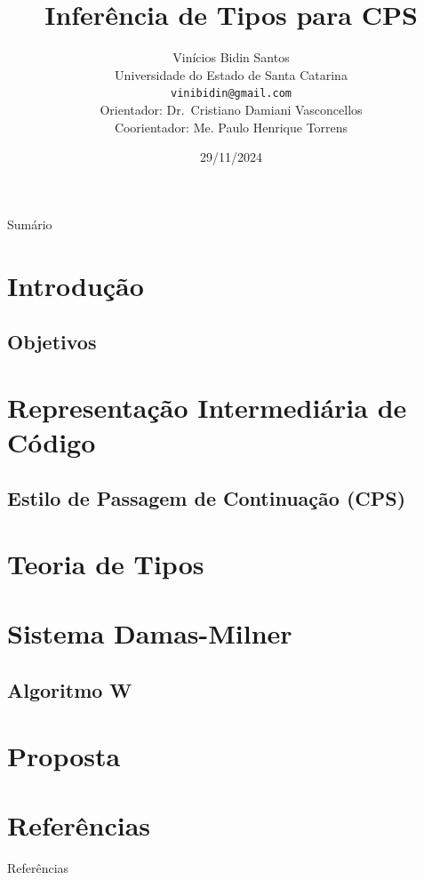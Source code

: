 \documentclass[xcolor=table]{beamer}
\title{Inferência de Tipos para CPS}
\author[Vinícios Bidin]{
    Vinícios Bidin Santos\\\smallskip
    {\scriptsize Universidade do Estado de Santa Catarina \\\smallskip
    \texttt{vinibidin@gmail.com}\\\medskip
    {Orientador: Dr.~Cristiano Damiani Vasconcellos}\\
    {Coorientador: Me. Paulo Henrique Torrens}\\
    }
}
\date{29/11/2024}
\begin{document}
\begin{frame}
    \titlepage%
\end{frame}

\begin{frame}[allowframebreaks]{Sumário}
    \tableofcontents
\end{frame}

\section[]{Introdução}

\subsection[]{Objetivos}


\section[]{Representação Intermediária de Código}

\subsection{Estilo de Passagem de Continuação (CPS)}

\section[]{Teoria de Tipos}

\section[]{Sistema Damas-Milner}

\subsection{Algoritmo W}


\section[]{Proposta}



\section[]{Referências}
\begin{frame}[allowframebreaks]{Referências}
    
\end{frame}
\end{document}
